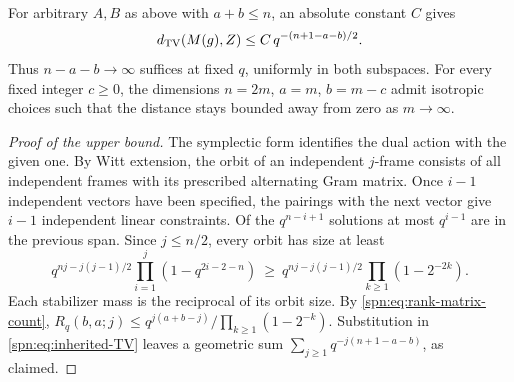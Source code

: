 \begin{theorem}\label{spn:thm:symplectic}
For arbitrary $A,B$ as above with $a+b\le n$, an absolute constant $C$ gives
\begin{equation}\label{spn:eq:symplectic-upper}
 d_{\mathrm{TV}}(M(g),Z)\le C\,q^{-(n+1-a-b)/2} .
\end{equation}
Thus $n-a-b\to\infty$ suffices at fixed $q$, uniformly in both subspaces. For
every fixed integer $c\ge0$, the dimensions $n=2m$, $a=m$, $b=m-c$ admit
isotropic choices such that the distance stays bounded away from zero as
$m\to\infty$.
\end{theorem}

\begin{proof}[Proof of the upper bound]
The symplectic form identifies the dual action with the given one. By Witt
extension, the orbit of an independent $j$-frame consists of all independent
frames with its prescribed alternating Gram matrix. Once $i-1$ independent
vectors have been specified, the pairings with the next vector give $i-1$
independent linear constraints. Of the $q^{n-i+1}$ solutions at most
$q^{i-1}$ are in the previous span. Since $j\le n/2$, every orbit has size at
least
\[
 q^{nj-j(j-1)/2}\prod_{i=1}^j(1-q^{2i-2-n})
 \ \ge\ q^{nj-j(j-1)/2}\prod_{k\ge1}(1-2^{-2k}).
\]
Each stabilizer mass is the reciprocal of its orbit size. By
\eqref{spn:eq:rank-matrix-count},
$R_q(b,a;j)\le q^{j(a+b-j)}/\prod_{k\ge1}(1-2^{-k})$. Substitution in
\eqref{spn:eq:inherited-TV} leaves a geometric sum
$\sum_{j\ge1}q^{-j(n+1-a-b)}$, as claimed.
\end{proof}

